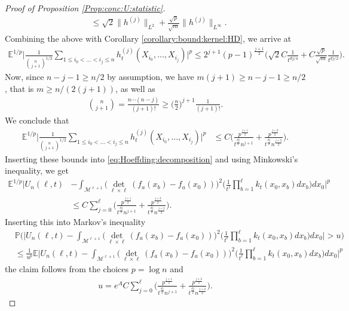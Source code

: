 \documentclass[10pt]{article}
\theoremstyle{plain}
\theoremstyle{definition}
\theoremstyle{remark}
\begin{document}
\begin{proof}[Proof of Proposition \ref{Prop:conc:U:statistic}]
\begin{align*}
        &\leq \sqrt{2}\|h^{(j)}\|_{L^2}+\frac{\sqrt{p}}{\sqrt{m}}\|h^{(j)}\|_{L^\infty}.
    \end{align*}
    Combining the above with Corollary \ref{corollary:bound:kernel:HD}, we arrive at
    \begin{align*}
        \mathbb{E}^{1/p}\Big|\frac{1}{\binom{n}{j+1}^{1/2}}\sum_{1\leq i_0<\dots<i_j\leq n}h_t^{(j)}(X_{i_0},\dots,X_{i_j})\Big|^p \leq 2^{j+1}(p-1)^{\frac{j+1}{2}}\Big(\sqrt{2}C\frac{1}{t^{dj/4}}+C\frac{\sqrt{p}}{\sqrt{m}}\frac{1}{t^{dj/2}}\Big).
    \end{align*}
    Now, since $n-j-1\geq n/2$ by assumption, we have $m(j+1)\geq n-j-1\geq n/2$, that is $m\geq n/(2(j+1))$, as well as
    \begin{align*}
        \binom{n}{j+1}=\frac{n\cdots (n-j)}{(j+1)!}\geq \Big(\frac{n}{2}\Big)^{j+1}\frac{1}{(j+1)!}.
    \end{align*}
    We conclude that 
    \begin{align*}
        \mathbb{E}^{1/p}\Big|\frac{1}{\binom{n}{j+1}^{1/2}}\sum_{1\leq i_0<\dots<i_j\leq n}h_t^{(j)}(X_{i_0},\dots,X_{i_j})\Big|^p
        &\leq C\Big(\frac{p^{\frac{j+1}{2}}}{t^{\frac{dj}{4}}n^{j+1}}+\frac{p^{\frac{j+2}{2}}}{t^{\frac{dj}{2}}n^{\frac{j+2}{2}}}\Big).
    \end{align*}
    Inserting these bounds into \eqref{eq:Hoeffding:decomposition} and using Minkowski's inequality, we get
    \begin{align*}
        \mathbb{E}^{1/p}\Big|U_{n}(\ell,t)&-\int_{\mathcal{M}^{\ell+1}}\Big(\det_{\ell\times\ell}(f_a(x_b)-f_a(x_0))\Big)^2\Big(\frac{1}{t^\ell}\prod_{b=1}^\ell k_t(x_0,x_b)dx_b\Big)dx_0\Big|^p\\
        &\leq C\sum_{j=0}^{\ell}\Big(\frac{p^{\frac{j+1}{2}}}{t^{\frac{dj}{4}}n^{j+1}}+\frac{p^{\frac{j+2}{2}}}{t^{\frac{dj}{2}}n^{\frac{j+2}{2}}}\Big).
    \end{align*}
    Inserting this into Markov's inequality
    \begin{align*}
        &\mathbb{P}\Big(\Big|U_{n}(\ell,t)-\int_{\mathcal{M}^{\ell+1}}\Big(\det_{\ell\times\ell}(f_a(x_b)-f_a(x_0))\Big)^2\Big(\frac{1}{t^\ell}\prod_{b=1}^\ell k_t(x_0,x_b)dx_b\Big)dx_0\Big|>u\Big)\\
        &\leq \frac{1}{u^p}\mathbb{E}\Big|U_{n}(\ell,t)-\int_{\mathcal{M}^{\ell+1}}\Big(\det_{\ell\times\ell}(f_a(x_b)-f_a(x_0))\Big)^2\Big(\frac{1}{t^\ell}\prod_{b=1}^\ell k_t(x_0,x_b)dx_b\Big)dx_0\Big|^p
    \end{align*}
    the claim follows from the choices $p=\log n$ and 
    \begin{align*}
        u=e^{A}C\sum_{j=0}^{\ell}\Big(\frac{p^{\frac{j+1}{2}}}{t^{\frac{dj}{4}}n^{j+1}}+\frac{p^{\frac{j+2}{2}}}{t^{\frac{dj}{2}}n^{\frac{j+2}{2}}}\Big).
    \end{align*}
\end{proof}
\end{document}

